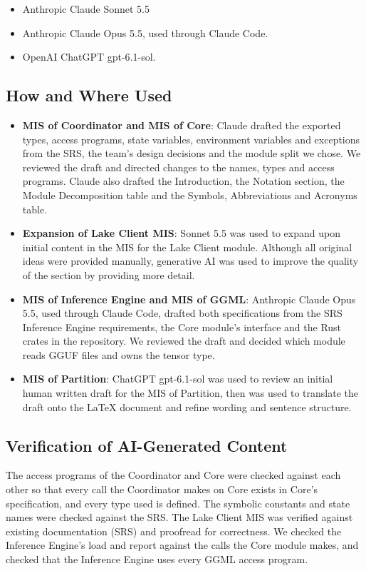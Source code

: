 \documentclass[12pt, titlepage]{article}
\begin{document}
\begin{itemize}
  \item Anthropic Claude Sonnet 5.5
  \item Anthropic Claude Opus 5.5, used through Claude Code.
  \item OpenAI ChatGPT gpt-6.1-sol.
\end{itemize}

\subsection{How and Where Used}

\begin{itemize}
    \item \textbf{MIS of Coordinator and MIS of Core}: Claude drafted the
    exported types, access programs, state variables, environment variables
    and exceptions from the SRS, the team's design decisions and the module
    split we chose. We reviewed the draft and directed changes to the names,
    types and access programs. Claude also drafted the Introduction, the
    Notation section, the Module Decomposition table and the Symbols,
    Abbreviations and Acronyms table.
    \item \textbf{Expansion of Lake Client MIS}: Sonnet 5.5 was used to expand 
    upon initial content in the MIS for the Lake Client module. Although all 
    original ideas were provided manually, generative AI was used to improve the 
    quality of the section by providing more detail.
    \item \textbf{MIS of Inference Engine and MIS of GGML}: Anthropic Claude
    Opus 5.5, used through Claude Code, drafted both specifications from the
    SRS Inference Engine requirements, the Core module's interface and the Rust
    crates in the repository. We reviewed the draft and decided which module
    reads GGUF files and owns the tensor type.
    \item \textbf{MIS of Partition}: ChatGPT gpt-6.1-sol was used to review an initial human written draft for the 
    MIS of Partition, then was used to translate the draft onto the LaTeX document 
    and refine wording and sentence structure.
\end{itemize}

\subsection{Verification of AI-Generated Content}

The access programs of the Coordinator and Core were checked against each other
so that every call the Coordinator makes on Core exists in Core's
specification, and every type used is defined. The symbolic constants and
state names were checked against the SRS. The Lake Client MIS was verified
against existing documentation (SRS) and proofread for correctness. We checked the Inference Engine's load and report against the calls the Core
module makes, and checked that the Inference Engine uses every GGML access
program.
\end{document}
